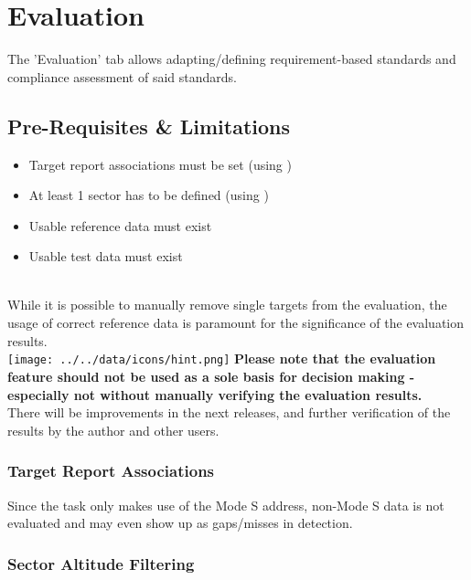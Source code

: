 \chapter{Evaluation}
\label{sec:eval} 

The 'Evaluation' tab allows adapting/defining requirement-based standards and compliance assessment of said standards. \\

\section{Pre-Requisites \& Limitations}
\label{sec:eval_prereq} 

\begin{itemize}  
\item Target report associations must be set (using )
\item At least 1 sector has to be defined (using )
\item Usable reference data must exist
\item Usable test data must exist
\end{itemize}
\ \\

While it is possible to manually remove single targets from the evaluation, the usage of correct reference data is paramount for the significance of the evaluation results. \\

\texttt{[image: ../../data/icons/hint.png]} \textbf{Please note that the evaluation feature should not be used as a sole basis for decision making - especially not without manually verifying the evaluation results.} \\

There will be improvements in the next releases, and further verification of the results by the author and other users.

\subsection{Target Report Associations}

Since the task only makes use of the Mode S address, non-Mode S data is not evaluated and may even show up as gaps/misses in detection.

\subsection{Sector Altitude Filtering}

